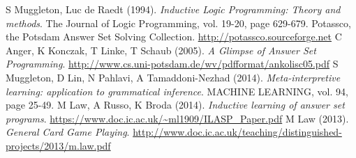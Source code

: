 \documentclass[a4paper,twoside,notitlepage]{article}
\begin{document}
\begin{thebibliography}{9}
        S Muggleton, Luc de Raedt (1994). \emph{Inductive Logic Programming: 
        Theory and methods}. The Journal of Logic Programming, vol. 19-20, page 
        629-679.
        Potassco, the Potsdam Answer Set Solving Collection. 
        \url{http://potassco.sourceforge.net}
        C Anger, K Konczak, T Linke, T Schaub (2005). \emph{A 
        Glimpse of Answer Set Programming}. 
        \url{http://www.cs.uni-potsdam.de/wv/pdfformat/ankolisc05.pdf}
        S Muggleton, D Lin, N Pahlavi, A Tamaddoni-Nezhad (2014). 
        \emph{Meta-interpretive learning: application to grammatical inference}.
        MACHINE LEARNING, vol. 94, page 25-49.
        M Law, A Russo, K Broda (2014). \emph{Inductive learning of answer set 
        programs}. \url{https://www.doc.ic.ac.uk/~ml1909/ILASP_Paper.pdf}
        M Law (2013). \emph{General Card Game Playing}.
        \url{http://www.doc.ic.ac.uk/teaching/distinguished-projects/2013/m.law.pdf}
\end{thebibliography}
\end{document}
